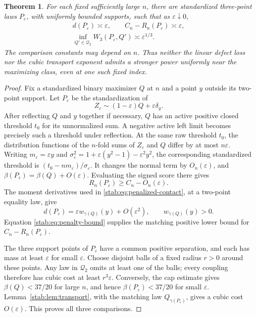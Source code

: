 \documentclass[11pt,a4paper]{article}
\numberwithin{equation}{section}
\newtheorem{theorem}{Theorem}[section]
\theoremstyle{definition}
\theoremstyle{remark}
\begin{document}
\begin{theorem}\label{stab:thm:sharpness}
For each fixed sufficiently large $n$, there are standardized three-point
laws $P_\varepsilon$, with uniformly bounded supports, such that as
$\varepsilon\downarrow0$,
\[
 \begin{gathered}
 d(P_\varepsilon)\asymp\varepsilon,\qquad
 C_n-R_n(P_\varepsilon)\asymp\varepsilon,\\
 \inf_{Q'\in\mathcal Q_2}W_3(P_\varepsilon,Q')\asymp\varepsilon^{1/3}.
 \end{gathered}
\]
The comparison constants may depend on $n$. Thus neither the linear
defect loss nor the cubic transport exponent admits a stronger power
uniformly near the maximizing class, even at one such fixed index.
\end{theorem}
\begin{proof}
Fix a standardized binary maximizer $Q$ at $n$ and a point $y$ outside
its two-point support. Let $P_\varepsilon$ be the standardization of
\[
                 Z_\varepsilon\sim(1-\varepsilon)Q+\varepsilon\delta_y.
\]
After reflecting $Q$ and $y$ together if necessary, $Q$ has an active positive closed
threshold $t_0$ for its unnormalized sum. A negative active left limit
becomes precisely such a threshold under reflection. At the same raw
threshold $t_0$, the distribution functions of the $n$-fold sums of
$Z_\varepsilon$ and $Q$ differ by at most $n\varepsilon$.
Writing $m_\varepsilon=\varepsilon y$ and
$\sigma_\varepsilon^2=1+\varepsilon(y^2-1)-\varepsilon^2y^2$, the
corresponding standardized threshold is
$(t_0-nm_\varepsilon)/\sigma_\varepsilon$.
It changes the normal term by $O_n(\varepsilon)$, and
$\beta(P_\varepsilon)=\beta(Q)+O(\varepsilon)$. Evaluating the signed
score there gives
\[
                 R_n(P_\varepsilon)\ge C_n-O_n(\varepsilon).
\]
The moment derivatives used in \eqref{stab:eq:penalized-contact}, at a
two-point equality law, give
\[
 d(P_\varepsilon)=\varepsilon w_{\gamma(Q)}(y)+O(\varepsilon^2),
 \qquad w_{\gamma(Q)}(y)>0.
\]
Equation \eqref{stab:eq:penalty-bound} supplies the matching positive lower
bound for $C_n-R_n(P_\varepsilon)$.

The three support points of $P_\varepsilon$ have a common positive
separation, and each has mass at least $\varepsilon$ for small
$\varepsilon$. Choose disjoint balls of a fixed radius $r>0$ around
these points. Any law in $\mathcal Q_2$ omits at least one of the balls;
every coupling therefore has cubic cost at least $r^3\varepsilon$.
Conversely, the cap estimate gives $\beta(Q)<37/20$ for large $n$,
and hence $\beta(P_\varepsilon)<37/20$ for small $\varepsilon$.
Lemma~\ref{stab:lem:transport}, with the matching law
$Q_{\gamma(P_\varepsilon)}$, gives a cubic cost $O(\varepsilon)$.
This proves all three comparisons.
\end{proof}
\end{document}
